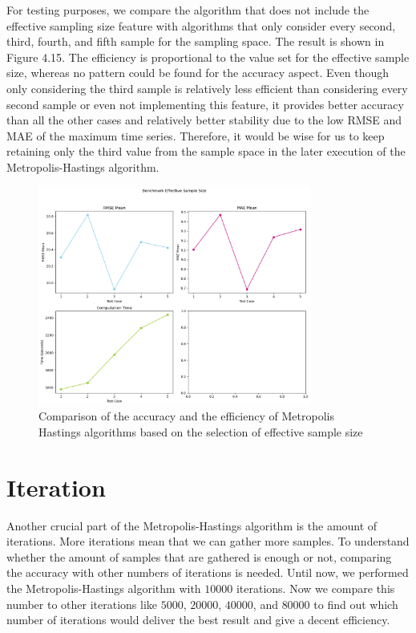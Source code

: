 For testing purposes, we compare the algorithm that does not include the effective sampling size feature with algorithms that only consider every second, third, fourth, and fifth sample for the sampling space. The result is shown in Figure 4.15. The efficiency is proportional to the value set for the effective sample size, whereas no pattern could be found for the accuracy aspect. Even though only considering the third sample is relatively less efficient than considering every second sample or even not implementing this feature, it provides better accuracy than all the other cases and relatively better stability due to the low RMSE and MAE of the maximum time series. Therefore, it would be wise for us to keep retaining only the third value from the sample space in the later execution of the Metropolis-Hastings algorithm.

\begin{figure}
    \centering
    \includegraphics[width=0.8\textwidth]{figures/basic_mh/benchmark/effective_sample_size.png}
    \captionsetup{width=.8\textwidth}
    \caption{Comparison of the accuracy and the efficiency of Metropolis Hastings algorithms based on the selection of effective sample size}
    \label{fig:enter-label}
\end{figure}


\section{Iteration}
Another crucial part of the Metropolis-Hastings algorithm is the amount of iterations. More iterations mean that we can gather more samples. To understand whether the amount of samples that are gathered is enough or not, comparing the accuracy with other numbers of iterations is needed. Until now, we performed the Metropolis-Hastings algorithm with $10000$ iterations. Now we compare this number to other iterations like $5000$, $20000$, $40000$, and $80000$ to find out which number of iterations would deliver the best result and give a decent efficiency.

